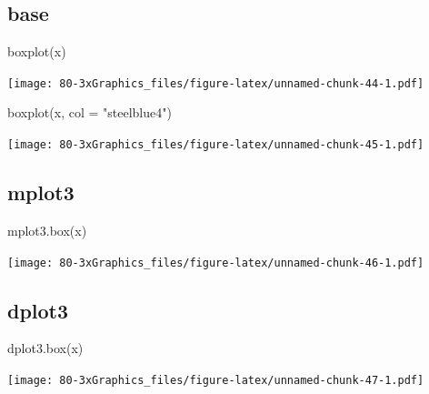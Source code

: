 \documentclass[
]{book}
\newenvironment{Shaded}{\begin{snugshade}}{\end{snugshade}}
\newcommand{\AttributeTok}[1]{\textcolor[rgb]{0.77,0.63,0.00}{#1}}
\newcommand{\FunctionTok}[1]{\textcolor[rgb]{0.00,0.00,0.00}{#1}}
\newcommand{\NormalTok}[1]{#1}
\newcommand{\StringTok}[1]{\textcolor[rgb]{0.31,0.60,0.02}{#1}}
\begin{document}
\hypertarget{base-6}{%
\subsection{base}\label{base-6}}

\begin{Shaded}
\begin{Highlighting}[]
\FunctionTok{boxplot}\NormalTok{(x)}
\end{Highlighting}
\end{Shaded}

\texttt{[image: 80-3xGraphics\_files/figure-latex/unnamed-chunk-44-1.pdf]}

\begin{Shaded}
\begin{Highlighting}[]
\FunctionTok{boxplot}\NormalTok{(x, }\AttributeTok{col =} \StringTok{"steelblue4"}\NormalTok{)}
\end{Highlighting}
\end{Shaded}

\texttt{[image: 80-3xGraphics\_files/figure-latex/unnamed-chunk-45-1.pdf]}

\hypertarget{mplot3-5}{%
\subsection{\texorpdfstring{\textbf{mplot3}}{mplot3}}\label{mplot3-5}}

\begin{Shaded}
\begin{Highlighting}[]
\FunctionTok{mplot3.box}\NormalTok{(x)}
\end{Highlighting}
\end{Shaded}

\texttt{[image: 80-3xGraphics\_files/figure-latex/unnamed-chunk-46-1.pdf]}

\hypertarget{dplot3-5}{%
\subsection{\texorpdfstring{\textbf{dplot3}}{dplot3}}\label{dplot3-5}}

\begin{Shaded}
\begin{Highlighting}[]
\FunctionTok{dplot3.box}\NormalTok{(x)}
\end{Highlighting}
\end{Shaded}

\texttt{[image: 80-3xGraphics\_files/figure-latex/unnamed-chunk-47-1.pdf]}
\end{document}
